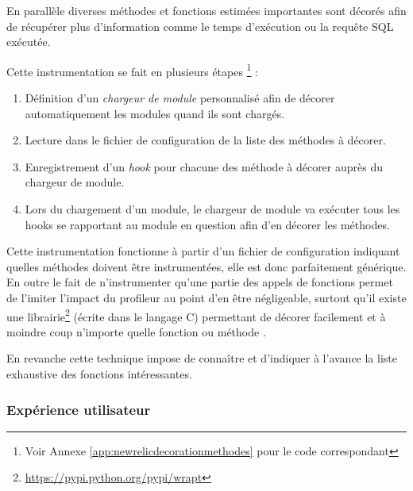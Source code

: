 En parallèle diverses méthodes et fonctions estimées importantes sont décorés afin de récupérer plus d'information comme le temps d'exécution ou la requête SQL exécutée.

Cette instrumentation se fait en plusieurs étapes \footnote{Voir Annexe \vref{app:newrelicdecorationmethodes} pour le code correspondant} :
\begin{enumerate}
  \item Définition d'un \emph{\gls{chargeur de module}} personnalisé afin de décorer automatiquement les modules quand ils sont chargés.
  \item Lecture dans le fichier de configuration de la liste des méthodes à décorer.
  \item Enregistrement d'un \emph{\gls{hook}} pour chacune des méthode à décorer auprès du chargeur de module.
  \item Lors du chargement d'un module, le chargeur de module va exécuter tous les hooks se rapportant au module en question afin d'en décorer les méthodes.
\end{enumerate}

Cette instrumentation fonctionne à partir d'un fichier de configuration indiquant quelles méthodes doivent être instrumentées, elle est donc parfaitement générique. En outre le fait de n'instrumenter qu'une partie des appels de fonctions permet de l'imiter l'impact du profileur au point d'en être négligeable, surtout qu'il existe une librairie\footnote{\url{https://pypi.python.org/pypi/wrapt}} (écrite dans le langage C) permettant de décorer facilement et à moindre coup n'importe quelle fonction ou méthode \Python.

En revanche cette technique impose de connaître et d'indiquer à l'avance la liste exhaustive des fonctions intéressantes.

  \subsubsection{Expérience utilisateur}